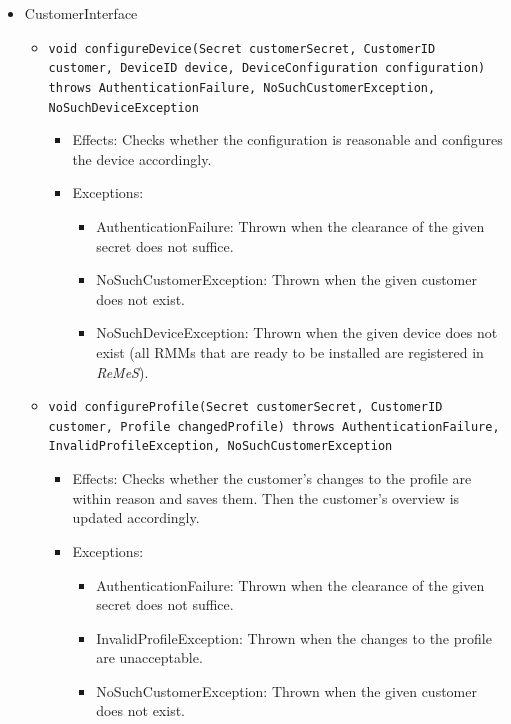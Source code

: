\documentclass[a4paper,10pt]{article}
\newcommand{\rem}{\emph{ReMeS}\xspace}
\begin{document}
\begin{itemize}
    \item CustomerInterface
   	\begin{itemize}
    	\item \texttt{void configureDevice(Secret customerSecret, CustomerID customer, DeviceID device, DeviceConfiguration configuration) throws AuthenticationFailure, NoSuchCustomerException, NoSuchDeviceException}
        \begin{itemize}
        	\item Effects: Checks whether the configuration is reasonable and configures the device accordingly.
        	\item Exceptions:
            \begin{itemize}
            	\item AuthenticationFailure: Thrown when the clearance of the given secret does not suffice.
            	\item NoSuchCustomerException: Thrown when the given customer does not exist.
                \item NoSuchDeviceException: Thrown when the given device does not exist (all RMMs that are ready to be installed are registered in \rem).
            \end{itemize}
        \end{itemize}
        
    	\item \texttt{void configureProfile(Secret customerSecret, CustomerID customer, Profile changedProfile) throws AuthenticationFailure, InvalidProfileException, NoSuchCustomerException}
        \begin{itemize}
        	\item Effects: Checks whether the customer's changes to the profile are within reason and saves them. Then the customer's overview is updated accordingly.
        	\item Exceptions:
            \begin{itemize}
            	\item AuthenticationFailure: Thrown when the clearance of the given secret does not suffice.
                \item InvalidProfileException: Thrown when the changes to the profile are unacceptable.
            	\item NoSuchCustomerException: Thrown when the given customer does not exist.
            \end{itemize}
        \end{itemize}
        

\end{itemize}
\end{itemize}
\end{document}
